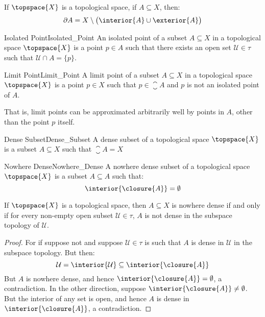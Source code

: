 \documentclass{article}                                                        %
\begin{document}
        \begin{theorem}
            If $\topspace{X}$ is a topological space, if $A\subseteq{X}$, then:
            \begin{equation}
                \partial{A}=X\setminus\big(\interior{A}\cup\exterior{A}\big)
            \end{equation}
        \end{theorem}
        \begin{fdefinition}{Isolated Point}{Isolated_Point}
            An isolated point of a subset $A\subseteq{X}$ in a topological space
            $\topspace{X}$ is a point $p\in{A}$ such that there exists an
            open set $\mathcal{U}\in\tau$ such that $\mathcal{U}\cap{A}=\{p\}$.
        \end{fdefinition}
        \begin{fdefinition}{Limit Point}{Limit_Point}
            A limit point of a subset $A\subseteq{X}$ in a topological space
            $\topspace{X}$ is a point $p\in{X}$ such that
            $p\in\closure{A}$ and $p$ is not an isolated point of $A$.
        \end{fdefinition}
        That is, limit points can be approximated arbitrarily well by points in
        $A$, other than the point $p$ itself.
        \begin{fdefinition}{Dense Subset}{Dense_Subset}
            A dense subset of a topological space $\topspace{X}$ is a subset
            $A\subseteq{X}$ such that $\closure{A}=X$
        \end{fdefinition}
        \begin{fdefinition}{Nowhere Dense}{Nowhere_Dense}
            A nowhere dense subset of a topological space $\topspace{X}$ is a
            subset $A\subseteq{A}$ such that:
            \begin{equation*}
                \interior{\closure{A}}=\emptyset
            \end{equation*}
        \end{fdefinition}
        \begin{theorem}
            If $\topspace{X}$ is a topological space, then $A\subseteq{X}$ is
            nowhere dense if and only if for every non-empty open subset
            $\mathcal{U}\in\tau$, $A$ is not dense in the subspace topology of
            $\mathcal{U}$.
        \end{theorem}
        \begin{proof}
            For if suppose not and suppose $\mathcal{U}\in\tau$ is such that
            $A$ is dense in $\mathcal{U}$ in the subspace topology. But then:
            \begin{equation}
                \mathcal{U}=\interior{\mathcal{U}}
                    \subseteq\interior{\closure{A}}
            \end{equation}
            But $A$ is nowhere dense, and hence
            $\interior{\closure{A}}=\emptyset$, a contradiction. In the other
            direction, suppose $\interior{\closure{A}}\ne\emptyset$. But the
            interior of any set is open, and hence $A$ is dense in
            $\interior{\closure{A}}$, a contradiction.
        \end{proof}
\end{document}
